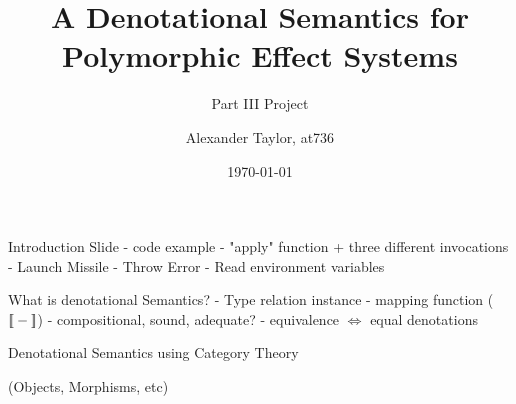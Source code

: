 \documentclass{beamer}
\title{A Denotational Semantics for Polymorphic Effect Systems}
\subtitle{Part III Project}
\author{Alexander Taylor, at736}
\institute{University of Cambridge}
\date{\today}
\newcommand\script[1]{}
\begin{document}
\begin{frame}
    \titlepage
\end{frame}

\begin{frame}{Introduction Slide}    
    - code example
        - "apply" function + three different invocations
            - Launch Missile
            - Throw Error
            - Read environment variables
    \script{
        - Imagine you're a compiler trying to analyse the side effects of this \texttt{doAction} function here.

        - You're not having the best of times
        - it's used three times with three different side effect - one's irrevocable - you can't speculatively execute it, one alters control flow, and the last accesses immutable state so you can do all sorts of optimisations.
        
        - Using some simple  analysis, you can create three separate instantiations of the function to analyse, so it's not too difficult in this case.
        - However in programs with higher order functions, creating these separate instantiations is undecidable in general

        - With a polymorphic effect system, it becomes a bit easier to analyse programs like this. But how do you know that your tools and optimisations are sound?
    }
\end{frame}

\begin{frame}{What is denotational Semantics? }
        - Type relation instance
        - mapping function (${\bf [\![}-{\bf ]\!]}$)
        - compositional, sound, adequate?
        - equivalence $ \Leftrightarrow$ equal denotations
    \script{
        - Denotational semantics is where we create a mapping between program terms and an abstract mathematical structure.
        - We want this to be compositional - meaning that each term's denotation is defined in terms of its subterms 
        - It should also be sound, meaning that equivalent program terms up-for, for example, beta-eta reduction, have equal denotations.
        - we also want it to be adequate - if two terms have equal denotations, then that should mean something useful about the relation of the two terms (e.g. can replace one by the other, etc)
    }
\end{frame}

\begin{frame}{Denotational Semantics using Category Theory}
    

    (Objects, Morphisms, etc)

    \script{
        - In part II, we used domains to handle the semantics of non-termination. Lurking beneath this notion is the idea that we can use category theoretic structure to construct our denotations.

        - Here we map types and type environments to objects in a particular category, and correctly typed terms to morphisms (arrows) in the category.

        - One more structure we need is a functor - a map of objects to objects and morphisms to morphisms that preserves composition of terms.
    }
\end{frame}
\end{document}
